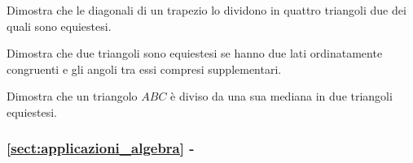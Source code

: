\begin{multicols}{2}
\begin{esercizio}
\label{ese:7.7}
Dimostra che le diagonali di un trapezio lo dividono in quattro 
triangoli due dei quali sono equiestesi.
\end{esercizio}

\begin{esercizio}
\label{ese:7.8}
Dimostra che due triangoli sono equiestesi se hanno due lati 
ordinatamente congruenti e gli angoli tra essi compresi supplementari.
\end{esercizio}

\begin{esercizio}
\label{ese:7.9}
Dimostra che un triangolo $ABC$ è diviso da una sua mediana in due 
triangoli equiestesi.
\end{esercizio}

\end{multicols}

\begingroup
\hypersetup{linkcolor=black}
\subsubsection*{\ref{sect:applicazioni_algebra} - 
}
\endgroup

